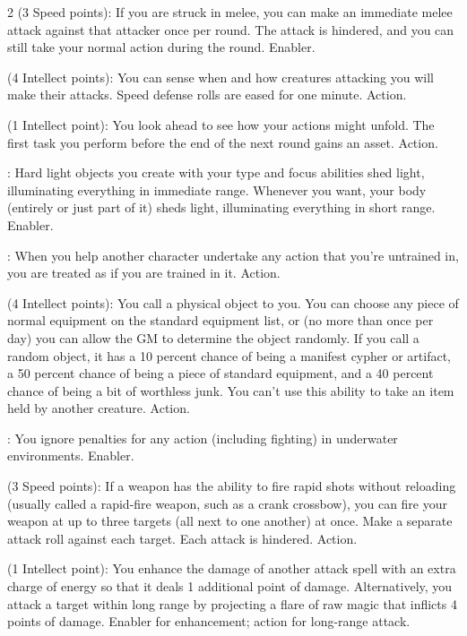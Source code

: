 \begin{multicols}{2}
 (3 Speed points): If you are struck in melee, you can make an immediate melee attack against that attacker once per round. The attack is hindered, and you can still take your normal action during the round. Enabler. 

 (4 Intellect points): You can sense when and how creatures attacking you will make their attacks. Speed defense rolls are eased for one minute. Action. 

 (1 Intellect point): You look ahead to see how your actions might unfold. The first task you perform before the end of the next round gains an asset. Action. 

: Hard light objects you create with your type and focus abilities shed light, illuminating everything in immediate range. Whenever you want, your body (entirely or just part of it) sheds light, illuminating everything in short range. Enabler.

: When you help another character undertake any action that you’re untrained in, you are treated as if you are trained in it. Action. 

 (4 Intellect points): You call a physical object to you. You can choose any piece of normal equipment on the standard equipment list, or (no more than once per day) you can allow the GM to determine the object randomly. If you call a random object, it has a 10 percent chance of being a manifest cypher or artifact, a 50 percent chance of being a piece of standard equipment, and a 40 percent chance of being a bit of worthless junk. You can’t use this ability to take an item held by another creature. Action. 

: You ignore penalties for any action (including fighting) in underwater environments. Enabler. 

 (3 Speed points): If a weapon has the ability to fire rapid shots without reloading (usually called a rapid-fire weapon, such as a crank crossbow), you can fire your weapon at up to three targets (all next to one another) at once. Make a separate attack roll against each target. Each attack is hindered. Action. 

 (1 Intellect point): You enhance the damage of another attack spell with an extra charge of energy so that it deals 1 additional point of damage. Alternatively, you attack a target within long range by projecting a flare of raw magic that inflicts 4 points of damage. Enabler for enhancement; action for long-range attack. 


\end{multicols}
